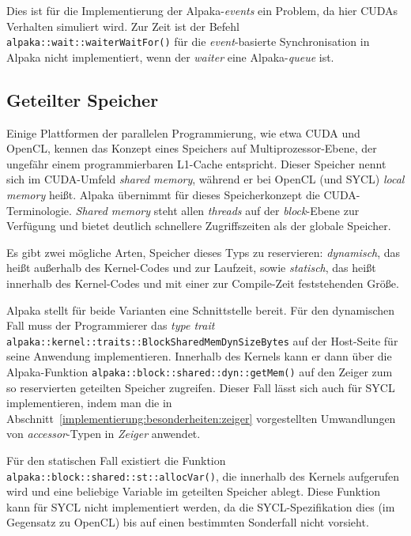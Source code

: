Dies ist für die Implementierung der Alpaka-\textit{events} ein Problem, da hier
CUDAs Verhalten simuliert wird. Zur Zeit ist der Befehl
\texttt{alpaka::wait::waiterWaitFor()} für die \textit{event}-basierte
Synchronisation in Alpaka nicht implementiert, wenn der \textit{waiter} eine
Alpaka-\textit{queue} ist.

\subsection{Geteilter Speicher}\label{implementierung:probleme:shared}

Einige Plattformen der parallelen Programmierung, wie etwa CUDA und OpenCL,
kennen das Konzept eines Speichers auf Multiprozessor-Ebene, der ungefähr
einem programmierbaren L1-Cache entspricht. Dieser Speicher nennt sich im
CUDA-Umfeld \textit{shared memory}, während er bei OpenCL (und SYCL)
\textit{local memory} heißt. Alpaka übernimmt für dieses Speicherkonzept die
CUDA-Terminologie. \textit{Shared memory} steht allen \textit{threads} auf
der \textit{block}-Ebene zur Verfügung und bietet deutlich schnellere
Zugriffszeiten als der globale Speicher.

Es gibt zwei mögliche Arten, Speicher dieses Typs zu reservieren:
\textit{dynamisch}, das heißt außerhalb des Kernel-Codes und zur Laufzeit, sowie
\textit{statisch}, das heißt innerhalb des Kernel-Codes und mit einer zur
Compile-Zeit feststehenden Größe.

Alpaka stellt für beide Varianten eine Schnittstelle bereit. Für den dynamischen
Fall muss der Programmierer das \textit{type trait}
\texttt{alpaka::kernel::traits::BlockSharedMemDynSizeBytes} auf der Host-Seite
für seine Anwendung implementieren. Innerhalb des Kernels kann er dann über die
Alpaka-Funktion \texttt{alpaka::block::shared::dyn::getMem()} auf den Zeiger
zum so reservierten geteilten Speicher zugreifen. Dieser Fall lässt sich auch
für SYCL implementieren, indem man die in
Abschnitt~\ref{implementierung:besonderheiten:zeiger} vorgestellten
Umwandlungen von \textit{accessor}-Typen in \textit{Zeiger} anwendet.

Für den statischen Fall existiert die Funktion
\texttt{alpaka::block::shared::st::allocVar()}, die innerhalb des Kernels
aufgerufen wird und eine beliebige Variable im geteilten Speicher ablegt. Diese
Funktion kann für SYCL nicht implementiert werden, da die SYCL-Spezifikation
dies (im Gegensatz zu OpenCL) bis auf einen bestimmten Sonderfall
\cite[siehe][Abschnitt 4.8.5.3]{sycl2019} nicht vorsieht.

